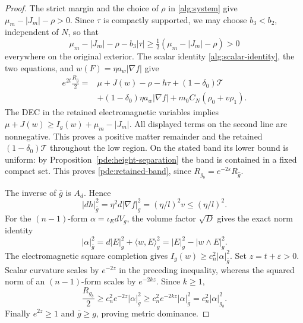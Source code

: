 \begin{proof}
The strict margin and the choice of \(\rho\) in
\eqref{alg:system} give
\(\mu_m-|J_m|-\rho>0\).  Since \(\tau\) is compactly supported,
we may choose \(b_3<b_2\), independent of \(N\), so that
\[
 \mu_m-|J_m|-\rho-b_3|\tau|
 \ge\tfrac12(\mu_m-|J_m|-\rho)>0
\]
everywhere on the original exterior.
The scalar identity \eqref{alg:scalar-identity}, the two equations,
and \(w(F)=\eta a_w|\nabla f|\) give
\begin{align*}
 e^{2t}\frac{R_{\widehat g}}2
 ={}&\mu+J(w)-\rho-h\tau+(1-\delta_0)\mathcal T\\
 &+(1-\delta_0)\eta a_w|\nabla f|
     +m_0C_N(\rho_0+v\rho_1).
\end{align*}
The DEC in the retained electromagnetic variables implies
\(\mu+J(w)\ge I_g(w)+\mu_m-|J_m|\).
All displayed terms on the second line are nonnegative.
This proves a positive matter remainder and the retained
\((1-\delta_0)\mathcal T\) throughout the low region.
On the stated band its lower bound is uniform: by
Proposition~\ref{pde:height-separation} the band is contained in a
fixed compact set.  This proves \eqref{pde:retained-band}, since
\(R_{g_b}=e^{-2\varepsilon}R_{\widehat g}\).

The inverse of \(\bar g\) is \(A_d\).  Hence
\[
 |dh|_{\bar g}^2
 =\eta^2d|\nabla f|_g^2
 =(\eta/l)^2v\le(\eta/l)^2.
\]
For the \((n-1)\)-form \(\alpha=\iota_EdV_g\), the volume factor
\(\sqrt D\) gives the exact norm identity
\begin{equation}
 |\alpha|_{\bar g}^2
 =d|E|_g^2+\langle w,E\rangle_g^2
 =|E|_g^2-|w\wedge E|_g^2.
 \label{pde:flux-form-norm}
\end{equation}
The electromagnetic square completion gives
\(I_g(w)\ge c_n^2|\alpha|_{\bar g}^2\).
Set \(z=t+\varepsilon>0\).  Scalar curvature scales by \(e^{-2z}\)
in the preceding inequality, whereas the squared norm of an
\((n-1)\)-form scales by \(e^{-2kz}\).  Since \(k\ge1\),
\[
 \frac{R_{g_b}}2
 \ge c_n^2e^{-2z}|\alpha|_{\bar g}^2
 \ge c_n^2e^{-2kz}|\alpha|_{\bar g}^2
 =c_n^2|\alpha|_{g_b}^2.
\]
Finally \(e^{2z}\ge1\) and \(\bar g\ge g\), proving metric dominance.
\end{proof}
